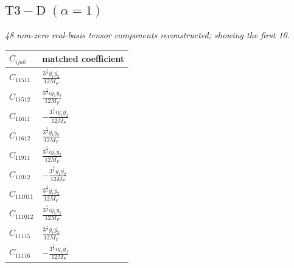 \documentclass[9pt]{article}
\begin{document}
\subsection*{$ \mathrm{T3-D}\;(\alpha=1) $}
\textit{48 non-zero real-basis tensor components reconstructed; showing the first 10.}
\begin{longtable}{@{}ll@{}}
\toprule
$C_{ijab}$ & matched coefficient \\
\midrule
$C_{11511}$ & $ \frac{3^{\frac{3}{4}} \overline{y_{1}} \overline{y_{2}}}{12 M_F} $ \\
$C_{11512}$ & $ \frac{3^{\frac{3}{4}} i \overline{y_{1}} \overline{y_{2}}}{12 M_F} $ \\
$C_{11611}$ & $ - \frac{3^{\frac{3}{4}} i \overline{y_{1}} \overline{y_{2}}}{12 M_F} $ \\
$C_{11612}$ & $ \frac{3^{\frac{3}{4}} \overline{y_{1}} \overline{y_{2}}}{12 M_F} $ \\
$C_{11911}$ & $ \frac{3^{\frac{3}{4}} i \overline{y_{1}} \overline{y_{2}}}{12 M_F} $ \\
$C_{11912}$ & $ - \frac{3^{\frac{3}{4}} \overline{y_{1}} \overline{y_{2}}}{12 M_F} $ \\
$C_{111011}$ & $ \frac{3^{\frac{3}{4}} \overline{y_{1}} \overline{y_{2}}}{12 M_F} $ \\
$C_{111012}$ & $ \frac{3^{\frac{3}{4}} i \overline{y_{1}} \overline{y_{2}}}{12 M_F} $ \\
$C_{11115}$ & $ \frac{3^{\frac{3}{4}} \overline{y_{1}} \overline{y_{2}}}{12 M_F} $ \\
$C_{11116}$ & $ - \frac{3^{\frac{3}{4}} i \overline{y_{1}} \overline{y_{2}}}{12 M_F} $ \\
\bottomrule
\end{longtable}
\end{document}
